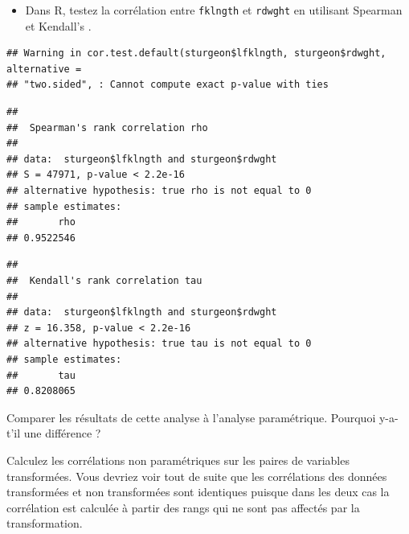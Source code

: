\documentclass[12pt,]{book}
\newenvironment{Shaded}{\begin{snugshade}}{\end{snugshade}}
\newcommand{\DataTypeTok}[1]{\textcolor[rgb]{0.13,0.29,0.53}{#1}}
\newcommand{\KeywordTok}[1]{\textcolor[rgb]{0.13,0.29,0.53}{\textbf{#1}}}
\newcommand{\NormalTok}[1]{#1}
\newcommand{\OperatorTok}[1]{\textcolor[rgb]{0.81,0.36,0.00}{\textbf{#1}}}
\newcommand{\StringTok}[1]{\textcolor[rgb]{0.31,0.60,0.02}{#1}}
\providecommand{\tightlist}{%
  \setlength{\itemsep}{0pt}\setlength{\parskip}{0pt}}
\begin{document}
\begin{itemize}
\tightlist
\item
  Dans R, testez la corrélation entre \texttt{fklngth} et \texttt{rdwght} en utilisant Spearman et Kendall's .
\end{itemize}

\begin{Shaded}
\end{Shaded}

\begin{verbatim}
## Warning in cor.test.default(sturgeon$lfklngth, sturgeon$rdwght, alternative =
## "two.sided", : Cannot compute exact p-value with ties
\end{verbatim}

\begin{verbatim}
## 
##  Spearman's rank correlation rho
## 
## data:  sturgeon$lfklngth and sturgeon$rdwght
## S = 47971, p-value < 2.2e-16
## alternative hypothesis: true rho is not equal to 0
## sample estimates:
##       rho 
## 0.9522546
\end{verbatim}

\begin{Shaded}
\end{Shaded}

\begin{verbatim}
## 
##  Kendall's rank correlation tau
## 
## data:  sturgeon$lfklngth and sturgeon$rdwght
## z = 16.358, p-value < 2.2e-16
## alternative hypothesis: true tau is not equal to 0
## sample estimates:
##       tau 
## 0.8208065
\end{verbatim}

Comparer les résultats de cette analyse à l'analyse paramétrique.
Pourquoi y-a-t'il une différence ?

Calculez les corrélations non paramétriques sur les paires de variables transformées.
Vous devriez voir tout de suite que les corrélations des données transformées et non transformées sont identiques puisque dans les deux cas la corrélation est calculée à partir des rangs qui ne sont pas affectés par la transformation.
\end{document}
